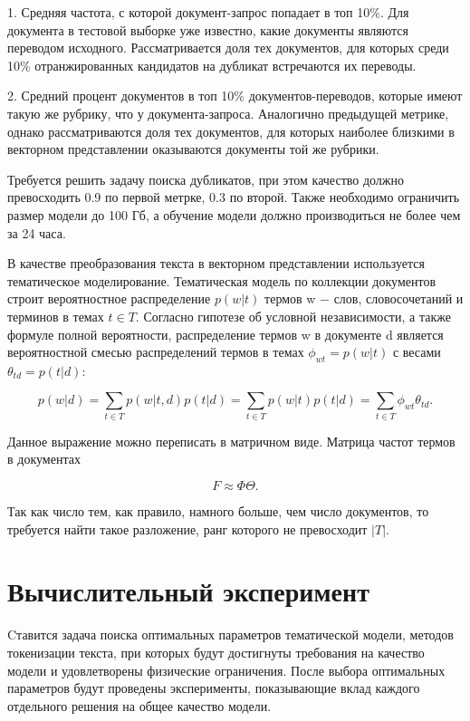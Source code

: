 \documentclass[12pt, twoside]{article}
\begin{document}
1. Средняя частота, с которой документ-запрос попадает в топ 10\%.  Для документа в тестовой выборке уже известно, какие документы являются переводом исходного. Рассматривается доля тех документов, для которых среди 10\% отранжированных кандидатов на дубликат встречаются их переводы. 

2. Средний процент документов в топ 10\% документов-переводов, которые имеют такую же рубрику, что у документа-запроса. Аналогично предыдущей метрике, однако рассматриваются доля тех документов, для которых наиболее близкими в векторном представлении оказываются документы той же рубрики.

Требуется решить задачу поиска дубликатов, при этом качество должно превосходить 0.9 по первой метрке, 0.3 по второй. Также необходимо ограничить размер модели до 100 Гб, а обучение модели должно производиться не более чем за 24 часа.

В качестве преобразования текста в векторном представлении используется тематическое моделирование. Тематическая модель \cite{basetematic}  по коллекции документов строит вероятностное распределение $p(w|t)$ термов w $-$ слов, словосочетаний и терминов в темах $t \in T$. Согласно гипотезе об условной независимости, а также формуле полной вероятности, распределение термов w в документе d является вероятностной смесью распределений термов в темах $\phi_{wt} = p(w|t)$ с весами $\theta_{td}=p(t|d)$:

\[p(w|d) = \sum_{t \in T} p(w|t, d)p(t|d) = \sum_{t \in T} p(w|t)p(t|d) =\sum_{t\in T}\phi_{wt}\theta_{td}.\]

Данное выражение можно переписать в матричном виде. Матрица частот термов в документах

\[F \approx \Phi \Theta.\]

Так как число тем, как правило, намного больше, чем число документов, то требуется найти такое разложение, ранг которого не превосходит $|T|$.


\section{Вычислительный эксперимент}

Cтавится задача поиска оптимальных параметров тематической модели, методов токенизации текста, при которых будут достигнуты требования на качество модели и удовлетворены физические ограничения. После выбора оптимальных параметров будут проведены эксперименты, показывающие вклад каждого отдельного решения на общее качество модели.
\end{document}

